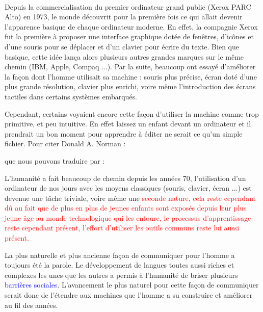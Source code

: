 \paragraph{}
Depuis la commercialisation du premier ordinateur grand public (Xerox PARC Alto) en 1973, le monde découvrit pour la première fois ce qui allait devenir l'apparence basique de chaque ordinateur moderne. En effet, la compagnie Xerox fut la première à proposer une interface graphique dotée de fenêtres, d'icônes et d'une souris pour se déplacer et d'un clavier pour écrire du texte. Bien que basique, cette idée lança alors plusieurs autres grandes marques sur le même chemin (IBM, Apple, Compaq ...). Par la suite, beaucoup ont essayé d'améliorer la façon dont l'homme utilisait sa machine : souris plus précise, écran doté d'une plus grande résolution, clavier plus enrichi, voire même l'introduction des écrans tactiles dans certains systèmes embarqués.
\par Cependant, certains voyaient encore cette façon d'utiliser la machine comme trop primitive, et peu intuitive. En effet laissez un enfant devant un ordinateur et il prendrait un bon moment pour apprendre à éditer ne serait ce qu'un simple fichier. Pour citer Donald A. Norman :
\begin{quote}
	\cite{don-norman}
\end{quote}
que nous pouvons traduire par :
\begin{quote}
\end{quote} 
L'humanité a fait beaucoup de chemin depuis les années 70, l'utilisation d'un ordinateur de nos jours avec les moyens classiques (souris, clavier, écran ...) est devenue une tâche triviale, voire même une \textcolor{red}{seconde nature, cela reste cependant dû au fait que de plus en plus de jeunes enfants sont exposés depuis leur plus jeune âge au monde technologique qui les entoure, le processus d'apprentissage reste cependant présent, l'effort d'utiliser les outils communs reste lui aussi présent.}
\par La plus naturelle et plus ancienne façon de communiquer pour l'homme a toujours été la parole. Le développement de langues toutes aussi riches et complexes les unes que les autres a permis à l'humanité de briser plusieurs \textcolor{blue}{barrières sociales}. L'avancement le plus naturel pour cette façon de communiquer serait donc de l'étendre aux machines que l'homme a su construire et améliorer au fil des années.
